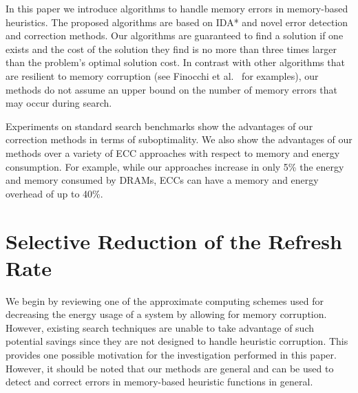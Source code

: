 \documentclass[letterpaper]{article}
\begin{document}
In this paper we introduce algorithms to handle memory errors in memory-based heuristics. %
The proposed algorithms are based on IDA* and novel error detection and correction methods. Our algorithms are guaranteed to find a solution if one exists and the cost of the solution they find is no more than three times larger than the problem's optimal solution cost. In contrast with other algorithms that are resilient to memory corruption (see Finocchi et al.~ for examples), our methods do not assume an upper bound on the number of memory errors that may occur during search.  

Experiments on standard search benchmarks show the advantages of our correction methods in terms of suboptimality. We also show the advantages of our methods over a variety of ECC approaches with respect to memory and energy consumption. For example, while our approaches increase in only 5\% the energy and memory consumed by DRAMs, ECCs can have a memory and energy overhead of up to 40\%.

\section{Selective Reduction of the Refresh Rate}

We begin by reviewing one of the approximate computing schemes used for decreasing the energy usage of a system by allowing for memory corruption. However, existing search techniques are unable to take advantage of such potential savings since they are not designed to handle heuristic corruption. This provides one possible motivation for the investigation performed in this paper. However, it should be noted that our methods are general and can be used to detect and correct errors in memory-based heuristic functions in general. 
\end{document}
